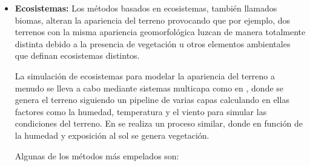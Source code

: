 \begin{itemize}
\begin{itemize}
                \end{itemize}
        
                \item \textbf{Ecosistemas:}
                Los métodos basados en ecosistemas, también llamados biomas, alteran la apariencia del terreno provocando que por ejemplo, dos terrenos con la misma apariencia geomorfológica luzcan de manera totalmente distinta debido a la presencia de vegetación u otros elementos ambientales que definan ecosistemas distintos. 

                La simulación de ecosistemas para modelar la apariencia del terreno a menudo se lleva a cabo mediante sistemas multicapa como en \cite{autobiomes}, donde se genera el terreno siguiendo un pipeline de varias capas calculando en ellas factores como la humedad, temperatura y el viento para simular las condiciones del terreno. En \cite{Cordonnier2017} se realiza un proceso similar, donde en función de la humedad y exposición al sol se genera vegetación.

                Algunas de los métodos más empelados son:


\end{itemize}
